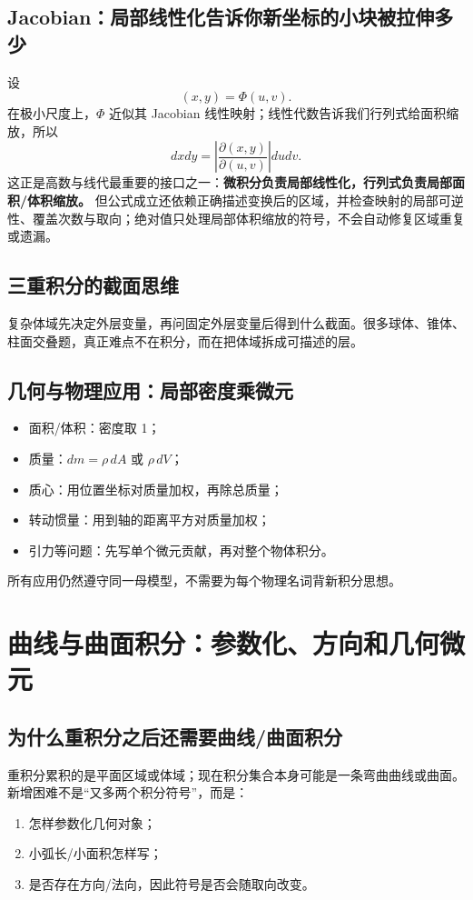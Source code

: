 \documentclass[11pt,a4paper,openany]{ctexbook}
\newcommand{\key}[1]{\textbf{\color{deep}#1}}
\begin{document}
\section{Jacobian：局部线性化告诉你新坐标的小块被拉伸多少}
设
\[
(x,y)=\Phi(u,v).
\]
在极小尺度上，$\Phi$ 近似其 Jacobian 线性映射；线性代数告诉我们行列式给面积缩放，所以
\[
\boxed{dxdy=\left\lvert\frac{\partial(x,y)}{\partial(u,v)}\right\rvert dudv}.
\]
这正是高数与线代最重要的接口之一：\key{微积分负责局部线性化，行列式负责局部面积/体积缩放。} 但公式成立还依赖正确描述变换后的区域，并检查映射的局部可逆性、覆盖次数与取向；绝对值只处理局部体积缩放的符号，不会自动修复区域重复或遗漏。

\section{三重积分的截面思维}
复杂体域先决定外层变量，再问固定外层变量后得到什么截面。很多球体、锥体、柱面交叠题，真正难点不在积分，而在把体域拆成可描述的层。

\section{几何与物理应用：局部密度乘微元}
\begin{itemize}
  \item 面积/体积：密度取 1；
  \item 质量：$dm=\rho\,dA$ 或 $\rho\,dV$；
  \item 质心：用位置坐标对质量加权，再除总质量；
  \item 转动惯量：用到轴的距离平方对质量加权；
  \item 引力等问题：先写单个微元贡献，再对整个物体积分。
\end{itemize}
所有应用仍然遵守同一母模型，不需要为每个物理名词背新积分思想。

\chapter{曲线与曲面积分：参数化、方向和几何微元}

\section{为什么重积分之后还需要曲线/曲面积分}
重积分累积的是平面区域或体域；现在积分集合本身可能是一条弯曲曲线或曲面。新增困难不是“又多两个积分符号”，而是：
\begin{enumerate}
  \item 怎样参数化几何对象；
  \item 小弧长/小面积怎样写；
  \item 是否存在方向/法向，因此符号是否会随取向改变。
\end{enumerate}
\end{document}
